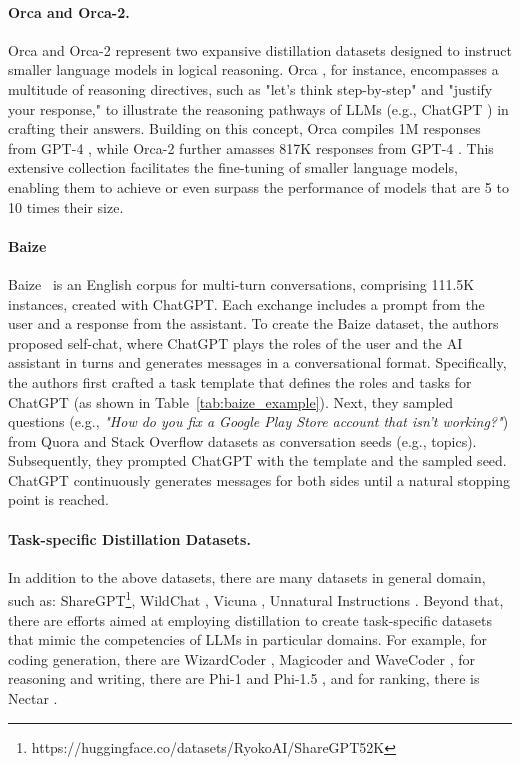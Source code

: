 \documentclass[11pt]{article}
\begin{document}
\paragraph{Orca and Orca-2.} Orca \cite{mukherjee2023orca} and Orca-2 \cite{mitra2023orca} represent two expansive distillation datasets designed to instruct smaller language models in logical reasoning. Orca \cite{mukherjee2023orca}, for instance, encompasses a multitude of reasoning directives, such as "let's think step-by-step" and "justify your response," to illustrate the reasoning pathways of LLMs (e.g., ChatGPT \cite{chatgpt}) in crafting their answers. Building on this concept, Orca \cite{mukherjee2023orca} compiles 1M responses from GPT-4 \cite{OpenAI2023GPT4TR}, while Orca-2 \cite{mitra2023orca} further amasses 817K responses from GPT-4 \cite{OpenAI2023GPT4TR}. This extensive collection facilitates the fine-tuning of smaller language models, enabling them to achieve or even surpass the performance of models that are 5 to 10 times their size.

\paragraph{Baize}
 
Baize~\citep{DatabricksBlog2023DollyV2} is an English corpus for multi-turn conversations, comprising 111.5K instances, created with ChatGPT. Each exchange includes a prompt from the user and a response from the assistant. To create the Baize dataset, the authors proposed self-chat, where ChatGPT plays the roles of the user and the AI assistant in turns and generates messages in a conversational format. Specifically, the authors first crafted a task template that defines the roles and tasks for ChatGPT (as shown in Table~\ref{tab:baize_example}). Next, they sampled questions (e.g., \textit{"How do you fix a Google Play Store account that isn’t working?"}) from Quora and Stack Overflow datasets as conversation seeds (e.g., topics). Subsequently, they prompted ChatGPT with the template and the sampled seed. ChatGPT continuously generates messages for both sides until a natural stopping point is reached. 


\paragraph{Task-specific Distillation Datasets.} In addition to the above datasets, there are many datasets in general domain, such as: ShareGPT\footnote{https://huggingface.co/datasets/RyokoAI/ShareGPT52K}, WildChat \cite{zhao2024wildchat}, Vicuna \cite{zheng2024judging}, Unnatural Instructions \citep{honovich2022unnatural}. Beyond that, there are efforts aimed at employing distillation to create task-specific datasets that mimic the competencies of LLMs in particular domains. For example, for coding generation, there are WizardCoder \cite{luo2023wizardcoder}, Magicoder \cite{wei2023magicoder} and WaveCoder \cite{yu2023wavecoder}, for reasoning and writing, there are Phi-1 \cite{gunasekar2023textbooks} and Phi-1.5 \cite{li2023textbooks}, and for ranking, there is Nectar \cite{zhu2023starling}.
\end{document}
